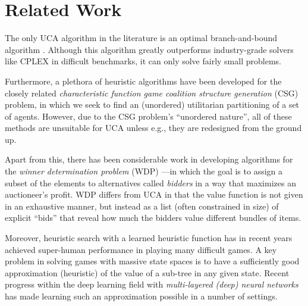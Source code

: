 \documentclass[runningheads]{llncs}
\begin{document}
	
	\section{Related Work}
	
	The only UCA algorithm in the literature is an optimal branch-and-bound algorithm \cite{prantare2018anytime,prantare2020anytime}. Although this algorithm greatly outperforms industry-grade solvers like CPLEX in difficult benchmarks, it can only solve fairly small problems. 
	
	Furthermore, a plethora of heuristic algorithms \cite{sen2000searching,keinanen2009simulated,di2010coalition,yeh2016solving,farinelli2017hierarchical} have been developed for the closely related \emph{characteristic function game coalition structure generation} (CSG) problem, in which we seek to find an (unordered) utilitarian partitioning of a set of agents. However, due to the CSG problem's ``unordered nature'', all of these methods are unsuitable for UCA unless e.g., they are redesigned from the ground up.
	
	Apart from this, there has been considerable work in developing algorithms for the \emph{winner determination problem} (WDP) \cite{andersson2000integer,sandholm2002winner,sandholm2002algorithm}---in which the goal is to assign a subset of the elements to alternatives called \emph{bidders} in a way that maximizes an auctioneer's profit. WDP differs from UCA in that the value function is not given in an exhaustive manner, but instead as a list (often constrained in size) of explicit ``bids'' that reveal how much the bidders value different bundles of items. %
	
	Moreover, heuristic search with a learned heuristic function has in recent years achieved super-human performance in playing many difficult games. A key problem in solving games with massive state spaces is to have a sufficiently good approximation (heuristic) of the value of a sub-tree in any given state. Recent progress within the deep learning field with \emph{multi-layered (deep) neural networks} has made learning such an approximation possible in a number of settings. \cite{lecun2015deep,silver2016mastering} 
	
\end{document}
